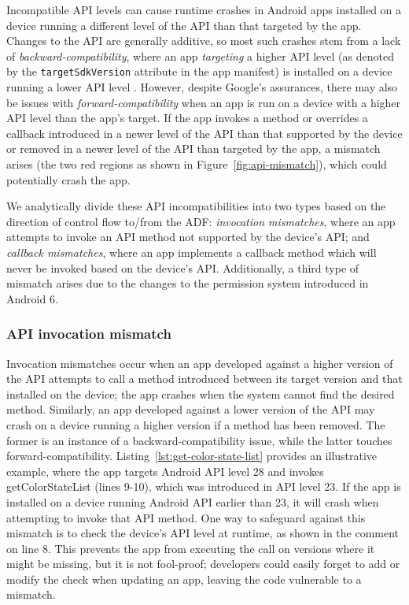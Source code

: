 Incompatible API levels can cause runtime crashes in Android apps installed on a device running a different level of the API than that targeted by the app. 
Changes to the API are generally additive, so most such crashes stem from a lack of {\it backward-compatibility}, where an app \emph{targeting} a higher API level (as denoted by the {\tt targetSdkVersion} attribute in the app manifest) is installed on a device running a lower API level \cite{sdkversions}. 
However, despite Google's assurances, there may also be issues with {\it forward-compatibility} when an app is run on a device with a higher API level than the app's target.
If the app invokes a method or overrides a callback introduced in a newer level of the API than that supported by the device or removed in a newer level of the API than targeted by the app, a mismatch arises (the two red regions as shown in Figure~\ref{fig:api-mismatch}), which could potentially crash the app.



We analytically divide these API incompatibilities into two types based on the direction of control flow to/from the ADF: {\it invocation mismatches}, where an app attempts to invoke an API method not supported by the device's API; and {\it callback mismatches}, where an app implements a callback method which will never be invoked based on the device's API.
Additionally, a third type of mismatch arises due to the changes to the permission system introduced in Android 6.

\subsubsection{API invocation mismatch} \label{sec:invocation-mismatch}

Invocation mismatches occur when an app developed against a higher version of the API attempts to call a method introduced between its target version and that installed on the device; the app crashes when the system cannot find the desired method. 
Similarly, an app developed against a lower version of the API may crash on a device running a higher version if a method has been removed.
The former is an instance of a backward-compatibility issue, while the latter touches forward-compatibility.
Listing~\ref{lst:get-color-state-list} provides an illustrative example, where the app targets Android API level 28 and invokes {\sf getColorStateList} (lines 9-10), which was introduced in API level 23.%
If the app is installed on a device running Android API earlier than 23, it will crash when attempting to invoke that API method.
One way to safeguard against this mismatch is to check the device's API level at runtime, as shown in the comment on line 8.
This prevents the app from executing the call on versions where it might be missing, but it is not fool-proof; developers could easily forget to add or modify the check when updating an app, leaving the code vulnerable to a mismatch.

